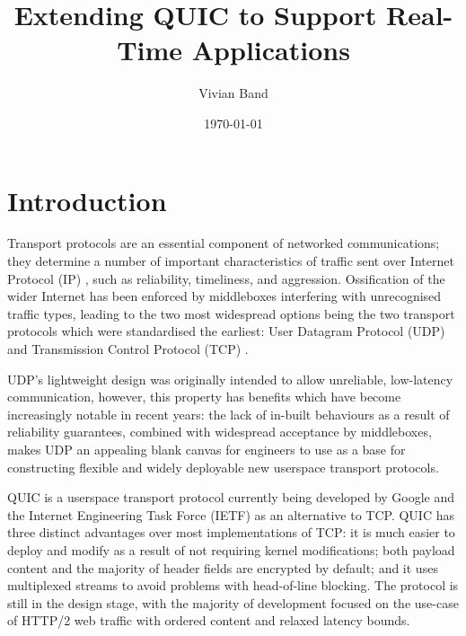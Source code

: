 \documentclass{mprop}
\begin{document}
\title{Extending QUIC to Support Real-Time Applications}
\author{Vivian Band}
\date{\today}
\maketitle

\tableofcontents
\newpage

\section{Introduction}\label{intro}


Transport protocols are an essential component of networked communications; they determine a 
number of important characteristics of traffic sent over Internet Protocol (IP) \cite{IP-RFC}, 
such as reliability, timeliness, and aggression. Ossification of the wider Internet has been 
enforced by middleboxes interfering with unrecognised traffic types, leading to the two most 
widespread options being the two transport protocols which were standardised the earliest: User 
Datagram Protocol (UDP) \cite{UDP-RFC} and Transmission Control Protocol (TCP) \cite{TCP-RFC}. 

UDP's lightweight design was originally intended to allow unreliable, low-latency communication, 
however, this property has benefits which have become increasingly notable in recent years: the 
lack of in-built behaviours as a result of reliability guarantees, combined with widespread 
acceptance by middleboxes, makes UDP an appealing blank canvas for engineers to use as a base for 
constructing flexible and widely deployable new userspace transport protocols.

QUIC \cite{quic-transport-16} is a userspace transport protocol currently being developed by Google and the Internet Engineering Task Force (IETF) as an alternative to TCP. QUIC has three distinct advantages over most implementations of TCP: it is much easier to deploy and modify as a result of not requiring kernel modifications; both payload content and the majority of header fields are encrypted by default; and it uses multiplexed streams to avoid problems with head-of-line blocking. The protocol is still in the design stage, with the majority of development focused on the use-case of HTTP/2 \cite{HTTP2-RFC} web traffic with ordered content and relaxed latency bounds.
\end{document}
